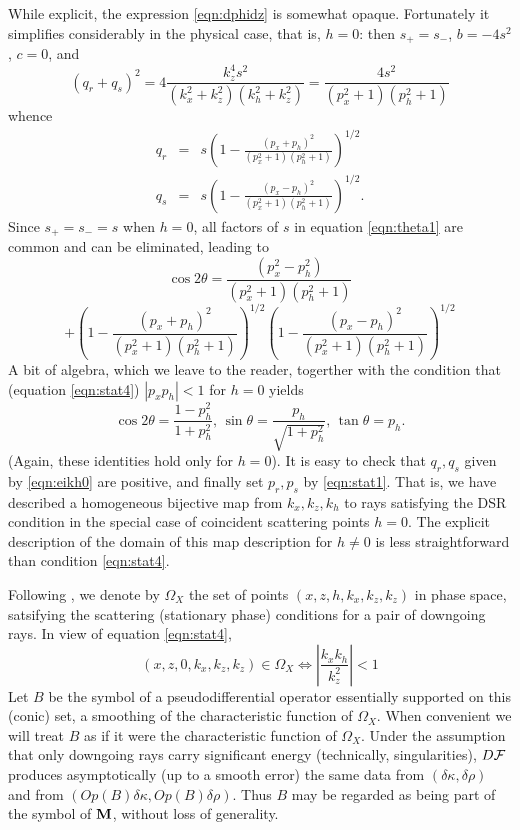 While explicit, the expression \ref{eqn:dphidz} is somewhat
opaque. Fortunately it simplifies considerably in the physical case,
that is, $h=0$: then $s_+=s_-$, $b=-4 s^2$, $c=0$, and 
\begin{equation}
\label{eqn:dphidzh0}
(q_r+q_s)^2 = 4\frac{k_z^4s^2}{(k_x^2+k_z^2)(k_h^2+k_z^2)}=\frac{4s^2}{(p_x^2+1)(p_h^2+1)}
\end{equation}
whence
\begin{eqnarray}
q_r & = & s\left(1 -
          \frac{(p_x+p_h)^2}{(p_x^2+1)(p_h^2+1)}\right)^{1/2} \nonumber \\
\label{eqn:eikh0}
q_s & = & s\left( 1 -
          \frac{(p_x-p_h)^2}{(p_x^2+1)(p_h^2+1)}\right)^{1/2}.
\end{eqnarray}
Since $s_+=s_-=s$ when $h=0$, all factors of $s$ in equation
\ref{eqn:theta1} are common and can be eliminated, leading to
\[
\cos 2 \theta
= \frac{(p_x^2-p_h^2)}{(p_x^2+1)(p_h^2+1)}
\]
\begin{equation}
\label{eqn:theta2}
+  \left(1 -
          \frac{(p_x+p_h)^2}{(p_x^2+1)(p_h^2+1)}\right)^{1/2}
\left(1 -
          \frac{(p_x-p_h)^2}{(p_x^2+1)(p_h^2+1)}\right)^{1/2}
\end{equation}
A bit of algebra, which we leave
to the reader, togerther with the condition that (equation
\ref{eqn:stat4}) $|p_xp_h|<1$ for $h=0$  yields
\begin{equation}
\label{eqn:theta3}
\cos 2 \theta = 
\frac{1-p_h^2}{1+p_h^2}, \, \sin \theta = \frac{p_h}{\sqrt{1+p_h^2}},
  \, \tan \theta = p_h.
\end{equation}
(Again, these identities hold only for $h=0$). It is easy to check
that $q_r,q_s$ given by \ref{eqn:eikh0} are positive, and finally set
$p_r,p_s$ by \ref{eqn:stat1}. That is, we have described a homogeneous
bijective map from $k_x,k_z,k_h$ to rays satisfying the DSR condition
in the special case of coincident scattering points $h=0$. The
explicit description of the domain of this map description for
$h \ne 0$ is less straightforward than condition \ref{eqn:stat4}.

Following \cite{tenKroode:12}, we denote by $\Omega_X$ the set of
points $(x,z,h,k_x,k_z,k_z)$ in phase space, satsifying the scattering
(stationary phase) conditions for a pair of downgoing rays. In view of
equation \ref{eqn:stat4}, 
\begin{equation}
\label{eqn:omegaxh0}
(x,z,0,k_x,k_z,k_z) \in \Omega_X \Leftrightarrow
\left|\frac{k_xk_h}{k_z^2}\right| < 1
\end{equation}
Let $B$ be
the symbol of a pseudodifferential operator essentially supported on this (conic)
set, a smoothing of the characteristic function of $\Omega_X$. When
convenient we will treat $B$ as if it were the characteristic function
of $\Omega_X$. Under the assumption that only downgoing rays carry
significant energy (technically, singularities), $D{\cal F}$ produces
asymptotically (up to a smooth error)
the same data from $(\delta \kappa,\delta \rho)$ and from 
$(Op(B)\delta \kappa, Op(B)\delta \rho)$. Thus $B$ may be regarded as
being part of the symbol of $\bf M$, without loss of generality.

